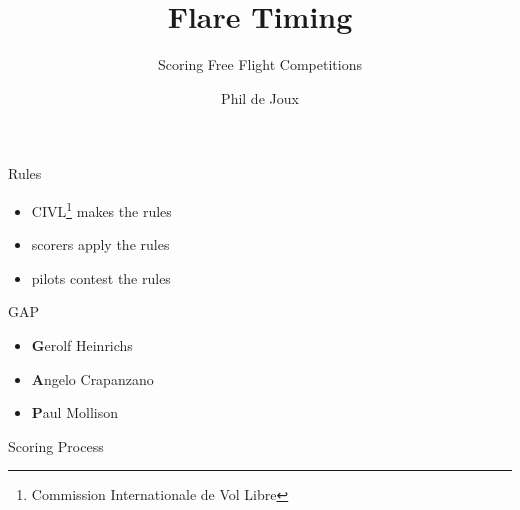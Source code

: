 \documentclass{beamer}
\title{Flare Timing}
\subtitle{Scoring Free Flight Competitions}
\author{Phil de Joux}
\institute{Block Scope}
\date{}
\begin{document}
\begin{frame}
\titlepage
\end{frame}

\begin{frame}{Rules}
\begin{itemize}
    \item CIVL\footnote{Commission Internationale de Vol Libre} makes the rules
    \item scorers apply the rules
    \item pilots contest the rules
\end{itemize}
\end{frame}

\begin{frame}{GAP}
\begin{itemize}
    \item \textbf{G}erolf Heinrichs
    \item \textbf{A}ngelo Crapanzano
    \item \textbf{P}aul Mollison
\end{itemize}
\end{frame}

\begin{frame}{Scoring Process}
\begin{figure}[!ht]
    \centering
    
    \label{fig:scoring-process}
\end{figure}
\end{frame}
\end{document}
